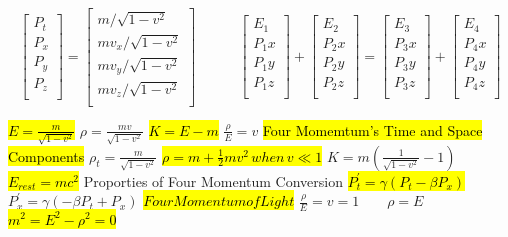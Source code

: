 \documentclass[6pt, oneside]{article}   	%
\begin{document}
\[
  \left[ {\begin{array}{c}
   P_t\\
   P_x\\
   P_y\\
   P_z\\
  \end{array} } \right]
  =
   \left[ {\begin{array}{c}
   m / \sqrt{1-v^2}\\
   mv_x / \sqrt{1-v^2}\\
   mv_y / \sqrt{1-v^2}\\
   mv_z / \sqrt{1-v^2}\\
  \end{array} } \right]
\quad \quad \quad
   \left[ {\begin{array}{c}
   E_1\\
   P_1x\\
   P_1y\\
   P_1z\\
  \end{array} } \right]
  +
    \left[ {\begin{array}{c}
   E_2\\
   P_2x\\
   P_2y\\
   P_2z\\
  \end{array} } \right]
  =
    \left[ {\begin{array}{c}
   E_3\\
   P_3x\\
   P_3y\\
   P_3z\\
  \end{array} } \right]
  +
    \left[ {\begin{array}{c}
   E_4\\
   P_4x\\
   P_4y\\
   P_4z\\
  \end{array} } \right]
\]

\hl{$E = \frac{m}{\sqrt{1-v^2}} $}
$\rho  = \frac{mv}{\sqrt{1-v^2}} $
\hl{$K  = E - m $}
$\frac{\rho}{E} = v$
\hl{Four Momemtum's Time and Space Components}
$\rho_t = \frac{m}{\sqrt{1-v^2}} $
\hl{$\rho = m + \frac{1}{2}mv^2\,when\,v\ll 1 $}
$K = m(\frac{1}{\sqrt{1-v^2}}-1) $
\hl{$E_{rest} = mc^2$}
Proporties of Four Momentum Conversion
\hl{$P_t^{\prime} = \gamma(P_t - \beta P_x) $}
$P_x^{\prime} = \gamma(-\beta P_t + P_x) $ 
\hl{$Four Momentum of Light$}
$\frac{\rho}{E} = v = 1 \qquad \rho = E \qquad$
\hl{$m^2 = E^2 - \rho^2 = 0$}
\end{document}
